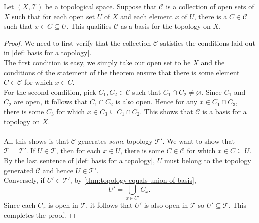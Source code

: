 \begin{theorem}\label{thm:open-cover-collection-basis-characterization}
    Let \( \left( X, \mathscr{T} \right) \) be a topological space. Suppose that \( \mathscr{C} \) is a collection of open sets of \( X \) such that for each open set \( U \) of  \( X \) and each element \( x \) of \( U \), there is a \( C \in \mathscr{C} \) such that \( x \in C \subseteq U \). This qualifies \( \mathscr{C} \) as a basis for the topology on \( X \).
\end{theorem}
\begin{proof}
    We need to first verify that the collection \( \mathscr{C} \) satisfies the conditions laid out in \cref{def: basis for a topology}. \\ 
    The first condition is easy, we simply take our open set to be \( X \) and the conditions of the statement of the theorem ensure that there is some element \( C \in \mathscr{C} \) for which \( x \in C \). \\ 
    For the second condition, pick \( C_{1}, C_{2} \in \mathscr{C} \) such that \( C_{1} \cap C_{2} \neq \varnothing \). Since \( C_{1} \) and \( C_{2} \) are open, it follows that \( C_{1} \cap C_{2} \) is also open. Hence for any \( x \in C_{1} \cap C_{3} \), there is some \( C_{3} \) for which \( x \in C_{3} \subseteq  C_{1} \cap C_{2} \). This shows that \( \mathscr{C} \) is a basis for a topology on \( X \). \\ \\ 
    All this shows is that \( \mathscr{C} \) generates \emph{some} topology \( \mathscr{T}' \). We want to show that \( \mathscr{T} = \mathscr{T}' \). If \( U \in \mathscr{T} \), then for each \( x \in U \), there is some \( C \in \mathscr{C} \) for which \( x \in C \subseteq U \). By the last sentence of \cref{def: basis for a topology}, \( U \) must belong to the topology generated \( \mathscr{C} \) and hence \( U \in \mathscr{T}' \). \\ 
    Conversely, if \( U' \in \mathscr{T}' \), by \cref{thm:topology-equals-union-of-basis}, 
    \[ U' = \bigcup_{x \in U'} C_{x} .\]
    Since each \( C_{x} \) is open in \( \mathscr{T} \), it follows that \( U' \) is also open in \( \mathscr{T} \) so \( U' \subseteq \mathscr{T} \). This completes the proof.
\end{proof}

